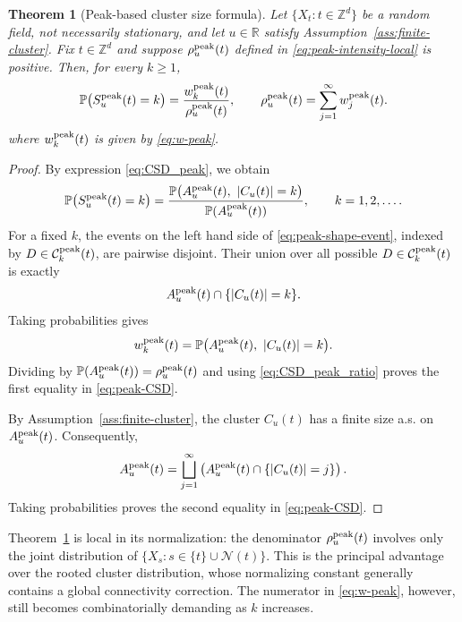 \documentclass[aap,preprint]{imsart}
\theoremstyle{plain}
\newtheorem{theorem}{Theorem}[section]
\theoremstyle{definition}
\def\R{{\mathbb R}}
\def\P{{\mathbb P}}
\def\Z{{\mathbb Z}}
\begin{document}
\begin{theorem}[Peak-based cluster size formula]
	\label{thm:peak-CSD}
	Let $\{X_t:t\in\Z^d\}$ be a random field, not necessarily stationary, and
	let $u\in\R$ satisfy Assumption~\ref{ass:finite-cluster}.  Fix
	$t\in\Z^d$ and suppose $\rho_u^{\rm peak}(t)$ defined in \eqref{eq:peak-intensity-local} is positive. Then, for every $k\geq1$,
	\begin{equation}\label{eq:peak-CSD}
		\P\bigl(S_u^{\rm peak}(t)=k\bigr)
		=
		\frac{w_k^{\rm peak}(t)}
		{\rho_u^{\rm peak}(t)}, \qquad \rho_u^{\rm peak}(t)
		=\sum_{j=1}^{\infty}w_j^{\rm peak}(t).
	\end{equation}
	where $w_k^{\rm peak}(t)$ is given by \eqref{eq:w-peak}.  
\end{theorem}

\begin{proof}
	By expression \eqref{eq:CSD_peak}, we obtain
	\begin{equation}\label{eq:CSD_peak_ratio}
		\P\bigl(S_u^{\rm peak}(t)=k\bigr) = \frac{\P\bigl(A_u^{\rm peak}(t),\ |C_u(t)|=k\bigr)}{\P(A_u^{\rm peak}(t))},
		\qquad k=1,2,\ldots.
	\end{equation}
	For a fixed $k$, the events on the left hand side of
	\eqref{eq:peak-shape-event}, indexed by
	$D\in\mathcal C_k^{\rm peak}(t)$, are pairwise disjoint.  Their union over all possible $D\in\mathcal C_k^{\rm peak}(t)$ is
	exactly
	\[
	A_u^{\rm peak}(t)\cap\{|C_u(t)|=k\}.
	\]
	Taking probabilities gives 
	\[
	w_k^{\rm peak}(t) =\P\bigl(A_u^{\rm peak}(t),\ |C_u(t)|=k\bigr).
	\]
	Dividing by
	$\P(A_u^{\rm peak}(t))=\rho_u^{\rm peak}(t)$ and using
	\eqref{eq:CSD_peak_ratio} proves the first equality in \eqref{eq:peak-CSD}.
	
	By Assumption~\ref{ass:finite-cluster}, the cluster $C_u(t)$ has a finite
	size a.s. on $A_u^{\rm peak}(t)$.  Consequently,
	\[
	A_u^{\rm peak}(t)
	=
	\bigsqcup_{j=1}^{\infty}
	\left(A_u^{\rm peak}(t)\cap\{|C_u(t)|=j\}\right).
	\]
	Taking probabilities proves the second equality in \eqref{eq:peak-CSD}.
\end{proof}
	
	Theorem~\ref{thm:peak-CSD} is local in its normalization: the denominator
	$\rho_u^{\rm peak}(t)$ involves only the joint distribution of
	$\{X_s:s\in\{t\}\cup\mathcal N(t)\}$.  This is the principal advantage over
	the rooted cluster distribution, whose normalizing constant generally
	contains a global connectivity correction.  The numerator in
	\eqref{eq:w-peak}, however, still becomes combinatorially demanding as $k$
	increases.
	
\end{document}
